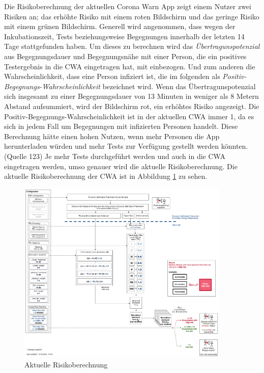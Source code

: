 \documentclass[conference]{IEEEtran}
\begin{document}
Die Risikoberechnung der aktuellen Corona Warn App zeigt einem Nutzer zwei Risiken an; 
das erhöhte Risiko mit einem roten Bildschirm und das geringe Risiko mit einem grünen Bildschirm. 
Generell wird angenommen, dass wegen der Inkubationszeit, Tests beziehungsweise Begegnungen innerhalb der letzten 14 Tage stattgefunden haben.
Um dieses zu berechnen wird das \textit{Übertragunspotenzial} aus Begegnungsdauer und Begegnungsnähe mit einer Person, 
die ein positives Testergebnis in die CWA eingetragen hat, mit einbezogen. Und zum anderen die Wahrscheinlichkeit, 
dass eine Person infiziert ist, die im folgenden als \textit{Positiv-Begegnungs-Wahrscheinlichkeit} bezeichnet wird.
Wenn das Übertragunspotenzial sich insgesamt zu einer Begegnungsdauer von 13 Minuten in weniger als 8 Metern Abstand aufsummiert, 
wird der Bildschirm rot, ein erhöhtes Risiko angezeigt. Die Positiv-Begegnungs-Wahrscheinlichkeit ist in der aktuellen CWA immer 1, 
da es sich in jedem Fall um Begegnungen mit infizierten Personen handelt.
Diese Berechnung hätte einen hohen Nutzen, wenn mehr Personen die App herunterladen würden und mehr Tests zur Verfügung gestellt werden könnten. (Quelle 123)
Je mehr Tests durchgeführt werden und auch in die CWA eingetragen werden, umso genauer wird die aktuelle Risikoberechnung. 
Die aktuelle Risikoberechnung der CWA ist in Abbildung \ref{Risikoberechnung_Abbildung} zu sehen.

\begin{figure}[h]
	\centering
	\includegraphics[width=0.9\textwidth]{"Aktuelle_Risikoberechnung"}
	\caption{Aktuelle Risikoberechnung \cite{Risikoberechnung}}
	\label{Risikoberechnung_Abbildung}
\end{figure}
\end{document}
